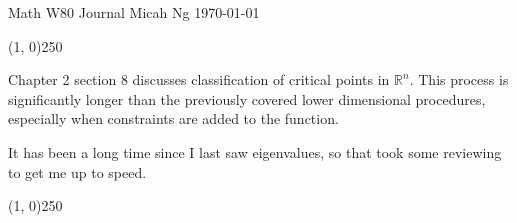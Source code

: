 \documentclass[11pt,letterpaper]{article}
\begin{document}
\noindent
Math W80 Journal \hfill Micah Ng \hfill \today

\begin{center}
\line(1, 0){250}
\end{center}

Chapter 2 section 8 discusses classification of critical points in
$\mathbb{R}^n$. This process is significantly longer than the previously
covered lower dimensional procedures, especially when constraints are added
to the function.

It has been a long time since I last saw eigenvalues, so that took some
reviewing to get me up to speed.

\begin{center}
\line(1, 0){250}
\end{center}
\end{document}
